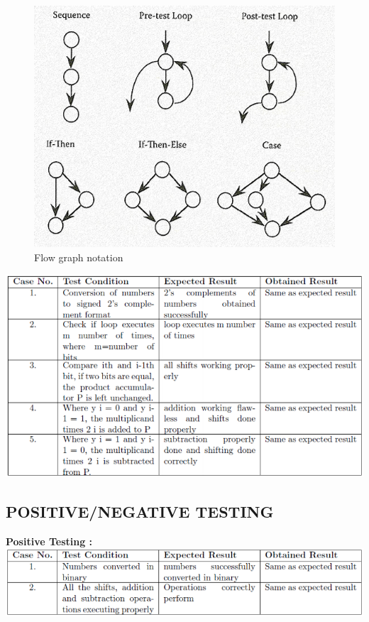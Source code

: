 \documentclass[a4paper,12pt]{article}
\begin{document}
	\begin{figure}[h!]
		\centering
		\includegraphics[scale=0.45]{CFG.png}
		\caption{Flow graph notation}
	\end{figure}

\includegraphics[width=\textwidth]{booth_whitebox}

\subsection{ POSITIVE/NEGATIVE TESTING }

\textbf{Positive Testing :}\\
\includegraphics[width=\textwidth]{booth_positive}
\vspace{30px}
\end{document}
